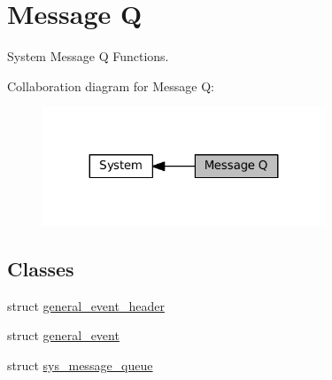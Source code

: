 \hypertarget{group__SYSTEM__MESSAGE__Q}{}\section{Message Q}
\label{group__SYSTEM__MESSAGE__Q}


System Message Q Functions.  


Collaboration diagram for Message Q\+:\nopagebreak
\begin{figure}[H]
\begin{center}
\leavevmode
\includegraphics[width=239pt]{group__SYSTEM__MESSAGE__Q}
\end{center}
\end{figure}
\subsection*{Classes}
\begin{DoxyCompactItemize}
\item 
struct \hyperlink{structgeneral__event__header}{general\+\_\+event\+\_\+header}
\item 
struct \hyperlink{structgeneral__event}{general\+\_\+event}
\item 
struct \hyperlink{structsys__message__queue}{sys\+\_\+message\+\_\+queue}
\end{DoxyCompactItemize}
